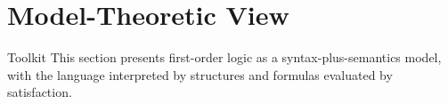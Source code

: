 \section{Model-Theoretic View}

\begin{toolkitbox}{Toolkit}
This section presents first-order logic as a syntax-plus-semantics model, with
the language interpreted by structures and formulas evaluated by satisfaction.
\end{toolkitbox}


